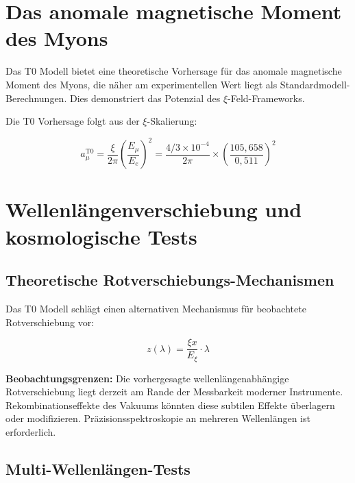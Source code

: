 \documentclass[12pt,a4paper]{report}
\newcommand{\Exi}{E_\xi}
\begin{document}
	\section{Das anomale magnetische Moment des Myons}
	
	\begin{experimentell}
		Das T0 Modell bietet eine theoretische Vorhersage für das anomale magnetische Moment des Myons, die näher am experimentellen Wert liegt als Standardmodell-Berechnungen. Dies demonstriert das Potenzial des $\xi$-Feld-Frameworks.
	\end{experimentell}
	
	Die T0 Vorhersage folgt aus der $\xi$-Skalierung:
	
	\begin{equation}
		a_\mu^{\text{T0}} = \frac{\xi}{2\pi} \left(\frac{E_\mu}{E_e}\right)^2 = \frac{4/3 \times 10^{-4}}{2\pi} \times \left(\frac{105,658}{0,511}\right)^2
	\end{equation}
	
	\section{Wellenlängenverschiebung und kosmologische Tests}
	
	\subsection{Theoretische Rotverschiebungs-Mechanismen}
	
	Das T0 Modell schlägt einen alternativen Mechanismus für beobachtete Rotverschiebung vor:
	
	\begin{equation}
		z(\lambda) = \frac{\xi x}{\Exi} \cdot \lambda
	\end{equation}
	
	\begin{vorsicht}
		\textbf{Beobachtungsgrenzen:} Die vorhergesagte wellenlängenabhängige Rotverschiebung liegt derzeit am Rande der Messbarkeit moderner Instrumente. Rekombinationseffekte des Vakuums könnten diese subtilen Effekte überlagern oder modifizieren. Präzisionsspektroskopie an mehreren Wellenlängen ist erforderlich.
	\end{vorsicht}
	
	\subsection{Multi-Wellenlängen-Tests}
	
\end{document}
